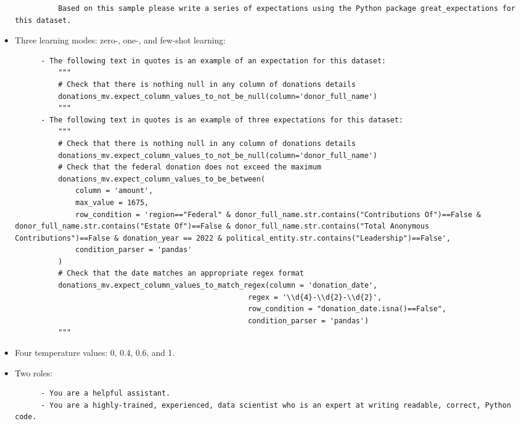 \documentclass[
  letterpaper,
  DIV=11,
  numbers=noendperiod]{scrartcl}
\begin{document}
\begin{itemize}
\begin{lstlisting}
          Based on this sample please write a series of expectations using the Python package great_expectations for this dataset.
  \end{lstlisting}
\item
  Three learning modes: zero-, one-, and few-shot learning:

  \begin{lstlisting}
      - The following text in quotes is an example of an expectation for this dataset:
          """
          # Check that there is nothing null in any column of donations details
          donations_mv.expect_column_values_to_not_be_null(column='donor_full_name')
          """
      - The following text in quotes is an example of three expectations for this dataset:
          """
          # Check that there is nothing null in any column of donations details
          donations_mv.expect_column_values_to_not_be_null(column='donor_full_name')
          # Check that the federal donation does not exceed the maximum
          donations_mv.expect_column_values_to_be_between(
              column = 'amount',
              max_value = 1675,
              row_condition = 'region=="Federal" & donor_full_name.str.contains("Contributions Of")==False & donor_full_name.str.contains("Estate Of")==False & donor_full_name.str.contains("Total Anonymous Contributions")==False & donation_year == 2022 & political_entity.str.contains("Leadership")==False',
              condition_parser = 'pandas'
          )
          # Check that the date matches an appropriate regex format
          donations_mv.expect_column_values_to_match_regex(column = 'donation_date',
                                                      regex = '\\d{4}-\\d{2}-\\d{2}',
                                                      row_condition = "donation_date.isna()==False",
                                                      condition_parser = 'pandas')
          """
  \end{lstlisting}
\item
  Four temperature values: 0, 0.4, 0.6, and 1.
\item
  Two roles:

  \begin{lstlisting}
      - You are a helpful assistant.
      - You are a highly-trained, experienced, data scientist who is an expert at writing readable, correct, Python code.
  \end{lstlisting}
\end{itemize}
\end{document}
